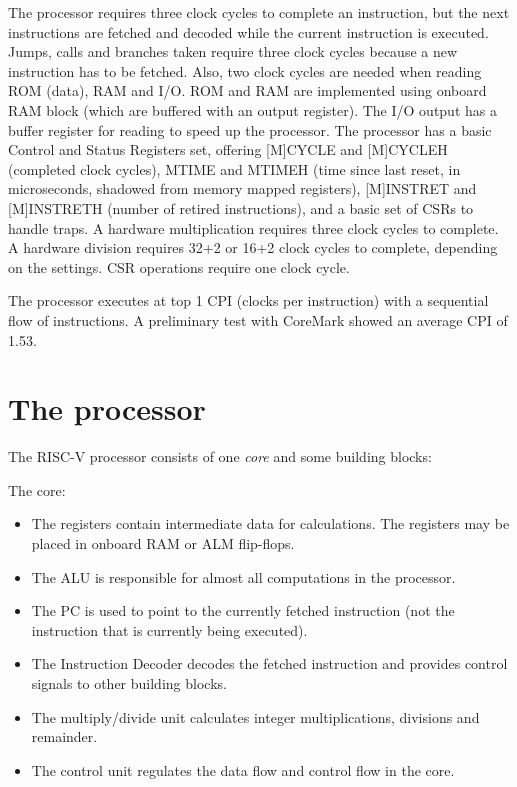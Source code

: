 \documentclass[12pt]{article}
\begin{document}
The processor requires three clock cycles to complete an instruction, but the next instructions are fetched and decoded while the current instruction is executed. Jumps, calls and branches taken require three clock cycles because a new instruction has to be fetched. Also, two clock cycles are needed when reading ROM (data), RAM and I/O. ROM and RAM are implemented using onboard RAM block (which are buffered with an output register). The I/O output has a buffer register for reading to speed up the processor. The processor has a basic Control and Status Registers set, offering [M]CYCLE and [M]CYCLEH (completed clock cycles), MTIME and MTIMEH (time since last reset, in microseconds, shadowed from memory mapped registers), [M]INSTRET and [M]INSTRETH (number of retired instructions), and a basic set of CSRs to handle traps. A hardware multiplication requires three clock cycles to complete. A hardware division requires 32+2 or 16+2 clock cycles to complete, depending on the settings. CSR operations require one clock cycle.

The processor executes at top 1 CPI (clocks per instruction) with a sequential flow of instructions. A preliminary test with CoreMark showed an average CPI of 1.53.

\section{The processor}
The RISC-V processor consists of one \textit{core} and some building blocks:

The core:
\begin{itemize}
\item The registers contain intermediate data for calculations. The registers may be placed in onboard RAM or ALM flip-flops.
\item The ALU is responsible for almost all computations in the processor.
\item The PC is used to point to the currently fetched instruction (not the instruction that is currently being executed).
\item The Instruction Decoder decodes the fetched instruction and provides control signals to other building blocks.
\item The multiply/divide unit calculates integer multiplications, divisions and remainder.
\item The control unit regulates the data flow and control flow in the core.
\end{itemize}
\end{document}
